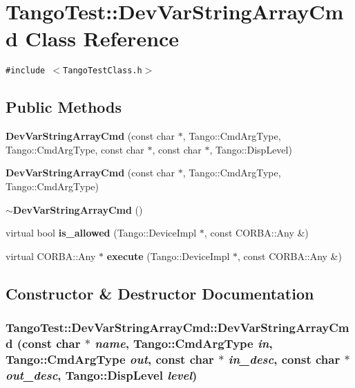 \section{Tango\-Test::Dev\-Var\-String\-Array\-Cmd  Class Reference}
\label{classTangoTest_1_1DevVarStringArrayCmd}
{\tt \#include $<$Tango\-Test\-Class.h$>$}

\subsection*{Public Methods}
\begin{CompactItemize}
\item 
{\bf Dev\-Var\-String\-Array\-Cmd} (const char $\ast$, Tango::Cmd\-Arg\-Type, Tango::Cmd\-Arg\-Type, const char $\ast$, const char $\ast$, Tango::Disp\-Level)
\item 
{\bf Dev\-Var\-String\-Array\-Cmd} (const char $\ast$, Tango::Cmd\-Arg\-Type, Tango::Cmd\-Arg\-Type)
\item 
{\bf $\sim$Dev\-Var\-String\-Array\-Cmd} ()
\item 
virtual bool {\bf is\_\-allowed} (Tango::Device\-Impl $\ast$, const CORBA::Any \&)
\item 
virtual CORBA::Any $\ast$ {\bf execute} (Tango::Device\-Impl $\ast$, const CORBA::Any \&)
\end{CompactItemize}


\subsection{Constructor \& Destructor Documentation}
\subsubsection{\setlength{\rightskip}{0pt plus 5cm}Tango\-Test::Dev\-Var\-String\-Array\-Cmd::Dev\-Var\-String\-Array\-Cmd (const char $\ast$ {\em name}, Tango::Cmd\-Arg\-Type {\em in}, Tango::Cmd\-Arg\-Type {\em out}, const char $\ast$ {\em in\_\-desc}, const char $\ast$ {\em out\_\-desc}, Tango::Disp\-Level {\em level})}\label{classTangoTest_1_1DevVarStringArrayCmd_a0}


